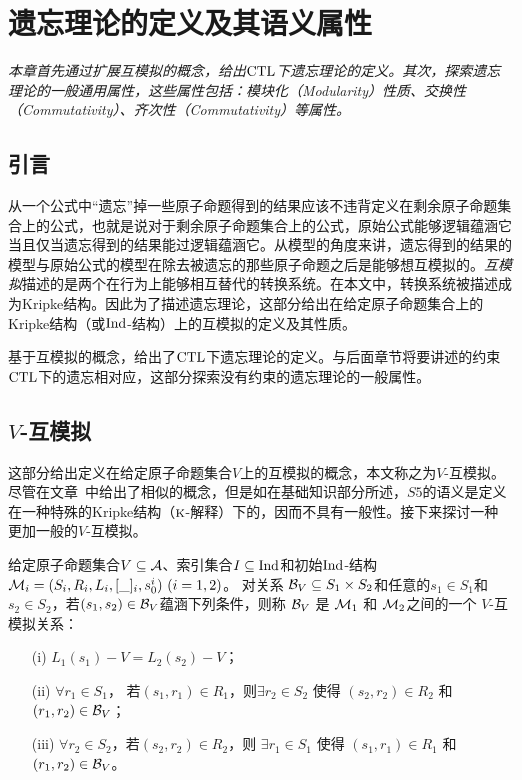 
\chapter{遗忘理论的定义及其语义属性}\label{chapter03}
{\em 本章首先通过扩展互模拟的概念，给出$\textrm{CTL}$下遗忘理论的定义。其次，探索遗忘理论的一般通用属性，这些属性包括：模块化（Modularity）性质、交换性（Commutativity）、齐次性（Commutativity）等属性。}

\section{引言}
从一个公式中“遗忘”掉一些原子命题得到的结果应该不违背定义在剩余原子命题集合上的公式，也就是说对于剩余原子命题集合上的公式，原始公式能够逻辑蕴涵它当且仅当遗忘得到的结果能过逻辑蕴涵它。从模型的角度来讲，遗忘得到的结果的模型与原始公式的模型在除去被遗忘的那些原子命题之后是能够想互模拟的。\emph{互模拟}描述的是两个在行为上能够相互替代的转换系统\cite{Baier:PMC:2008}。在本文中，转换系统被描述成为Kripke结构。因此为了描述遗忘理论，这部分给出在给定原子命题集合上的Kripke结构（或$\textrm{Ind}$-结构）上的互模拟的定义及其性质。

基于互模拟的概念，给出了$\textrm{CTL}$下遗忘理论的定义。与后面章节将要讲述的约束$\textrm{CTL}$下的遗忘相对应，这部分探索没有约束的遗忘理论的一般属性。

\section{$V$-互模拟}

这部分给出定义在给定原子命题集合$V$上的互模拟的概念，本文称之为$V$-互模拟。尽管在文章~\cite{Yan:AIJ:2009}中给出了相似的概念，但是如在基础知识部分所述，$S5$的语义是定义在一种特殊的Kripke结构（$\textsc{k}$-解释）下的，因而不具有一般性。接下来探讨一种更加一般的$V$-互模拟。


\begin{definition}[$V$-互模拟]
	\label{def:VInd:bisimulation}
	给定原子命题集合$V\subseteq\cal A$、索引集合$I\subseteq \textrm{Ind}$和初始$\textrm{Ind}$-结构 ${\cal M}_i=(S_i, R_i,L_i, [\_]_i, s_0^i)~(i=1,2)$。
	对关系 ${\cal B}_V \subseteq S_1 \times S_2$和任意的$s_1 \in S_1$和$s_2 \in S_2$，若$(s_1, s_2)\in {\cal B}_V$蕴涵下列条件，则称 ${\cal B}_V$ 是 ${\cal M}_1$ 和 ${\cal M}_2$之间的一个 $V$-互模拟关系：
	\begin{itemize}
		\item[(i)] $L_1(s_1) - V = L_2(s_2) -V$；
		\item[(ii)] $\forall r_1\in S_1$， 若$(s_1, r_1)\in R_1$，则$\exists r_2 \in S_2$ 使得 $(s_2,r_2) \in R_2$ 和 $(r_1, r_2) \in {\cal B}_V$；
		\item[(iii)] $\forall r_2\in S_2$，若$(s_2, r_2)\in R_2$，则 $\exists r_1 \in S_1$ 使得 $(s_1,r_1) \in R_1$ 和 $(r_1, r_2)\in {\cal B}_V$。
	\end{itemize}
\end{definition}


